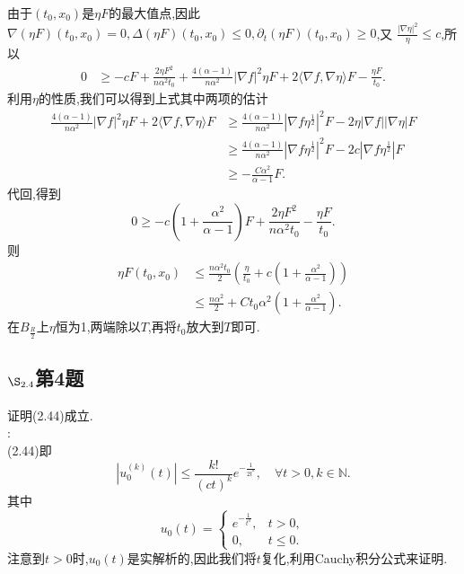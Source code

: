 \documentclass[12pt, a4paper]{ctexbook}
\begin{document}
    由于$(t_0,x_0)$是$\eta F$的最大值点,因此$\nabla(\eta F)(t_0,x_0)=0,\Delta(\eta F)(t_0,x_0)\le0,\partial_t(\eta F)(t_0,x_0)\ge 0$,又
    $\frac{|\nabla \eta|^2}{\eta}\le c $,所以
    \begin{align*}
    0&\ge -cF+\frac{2\eta F^2}{n\alpha^2t_0} + \frac{4(\alpha-1)}{n\alpha^2}|\nabla f|^2\eta F+2\langle\nabla f,\nabla\eta\rangle F-\frac{\eta F}{t_0}.
    \end{align*}
    利用$\eta$的性质,我们可以得到上式其中两项的估计
    \begin{align*}
    \frac{4(\alpha-1)}{n\alpha^2}|\nabla f|^2\eta F+2\langle\nabla f,\nabla\eta\rangle F&\ge \frac{4(\alpha-1)}{n\alpha^2}|\nabla f \eta^{\frac12}|^2 F-2\eta|\nabla f||\nabla \eta|F\\
    &\ge \frac{4(\alpha-1)}{n\alpha^2}|\nabla f \eta^{\frac12}|^2 F-2c|\nabla f\eta^{\frac12}|F\\
    &\ge -\frac{C\alpha^2}{\alpha-1}F.
    \end{align*}
    代回,得到
    \begin{equation*}
    0\ge -c(1+\frac{\alpha^2}{\alpha-1})F+\frac{2\eta F^2}{n\alpha^2t_0}-\frac{\eta F}{t_0}.
    \end{equation*}
    则
    \begin{align*}
    \eta F(t_0,x_0) &\le \frac{n\alpha^2 t_0}{2}\left(\frac{\eta}{t_0}+c(1+\frac{\alpha^2}{\alpha-1})\right)\\
    &\le \frac{n\alpha^2}{2}+Ct_0 \alpha^2(1+\frac{\alpha^2}{\alpha-1}).
    \end{align*}
    在$B_{\frac{R}{2}}$上$\eta$恒为1,两端除以$T$,再将$t_0$放大到$T$即可.
    \subsection{$\S_{2.4}$第4题}
    \kaishu{}证明(2.44)成立.     \\
    
    \songti{}:\\
    
    (2.44)即
    \begin{equation*}
    |u_0^{(k)}(t)| \le \frac{k!}{(ct)^k}e^{-\frac{1}{2t^a}},\quad \forall t >0,k\in \mathbb{N}.
    \end{equation*}
    其中
    \begin{equation*}
    u_0(t) =
    \begin{cases}
    e^{-\frac{1}{t^a}}, &t>0,\\
    0,&t\le 0.
    \end{cases}
    \end{equation*}
    注意到$t>0$时,$u_0(t)$是实解析的,因此我们将$t$复化,利用Cauchy积分公式来证明.
    
\end{document}
